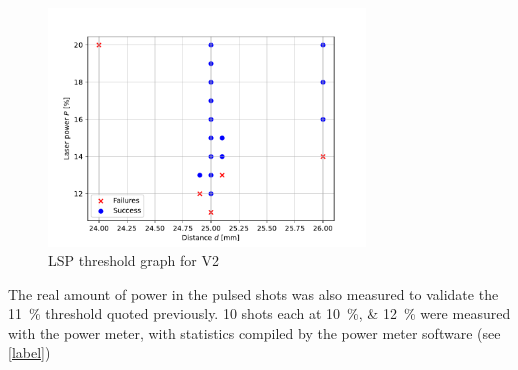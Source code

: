             \begin{figure}
                \centering
                \includegraphics[width=0.75\textwidth]{assets/5 results/V2_focus_threshold.pdf}
                \caption{LSP threshold graph for V2}
            \end{figure}

            The real amount of power in the pulsed shots was also measured to validate the \qty{11}{\%} threshold quoted previously. 10 shots each at \qtylist{10; 12}{\%} were measured with the power meter, with statistics compiled by the power meter software (see \autoref{label})

